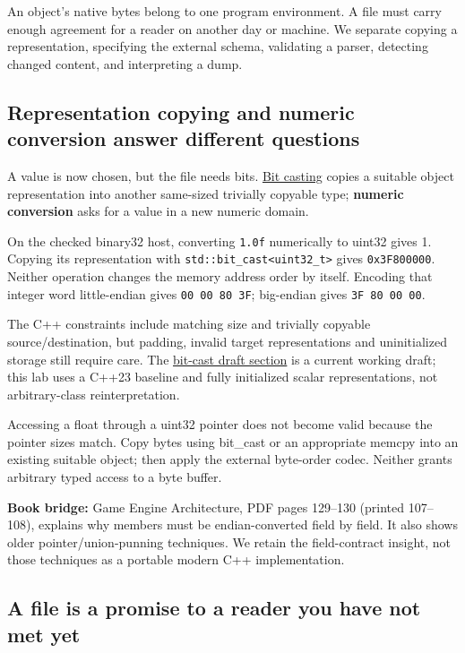 An object's native bytes belong to one program environment. A file must carry enough agreement for a reader on another day or machine. We separate copying a representation, specifying the external schema, validating a parser, detecting changed content, and interpreting a dump.

\subsection{Representation copying and numeric conversion answer different questions}\label{01-foundations-i-ch002-representation-copying-and-numeric-conversion-answer-different-questions}

A value is now chosen, but the file needs bits. \hyperref[appendix-34ee45f161c1]{Bit casting} copies a suitable object representation into another same-sized trivially copyable type; \textbf{numeric conversion} asks for a value in a new numeric domain.

On the checked binary32 host, converting \texttt{1.0f} numerically to uint32 gives 1. Copying its representation with \texttt{std::bit\_cast\textless{}uint32\_t\textgreater{}} gives \texttt{0x3F800000}. Neither operation changes the memory address order by itself. Encoding that integer word little-endian gives \texttt{00\ 00\ 80\ 3F}; big-endian gives \texttt{3F\ 80\ 00\ 00}.

The C++ constraints include matching size and trivially copyable source/destination, but padding, invalid target representations and uninitialized storage still require care. The \href{https://eel.is/c++draft/bit.cast}{bit-cast draft section} is a current working draft; this lab uses a C++23 baseline and fully initialized scalar representations, not arbitrary-class reinterpretation.

Accessing a float through a uint32 pointer does not become valid because the pointer sizes match. Copy bytes using bit\_cast or an appropriate memcpy into an existing suitable object; then apply the external byte-order codec. Neither grants arbitrary typed access to a byte buffer.

\textbf{Book bridge:} Game Engine Architecture, PDF pages 129--130 (printed 107--108), explains why members must be endian-converted field by field. It also shows older pointer/union-punning techniques. We retain the field-contract insight, not those techniques as a portable modern C++ implementation.

\subsection{A file is a promise to a reader you have not met yet}\label{01-foundations-i-ch002-a-file-is-a-promise-to-a-reader-you-have-not-met-yet}

